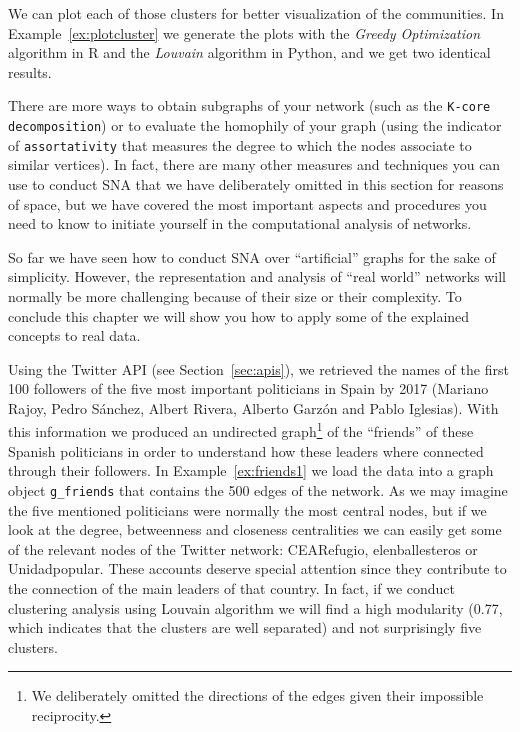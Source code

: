 
We can plot each of those clusters for better visualization of the communities. In Example~\ref{ex:plotcluster} we generate the plots with the \emph{Greedy Optimization} algorithm in R and the \emph{Louvain} algorithm in Python, and we get two identical results.


There are more ways to obtain subgraphs of your network (such as the \texttt{K-core decomposition}) or to evaluate the homophily of your graph (using the indicator of \texttt{assortativity} that measures the degree to which the nodes associate to similar vertices). In fact, there are many other measures and techniques you can use to conduct SNA that we have deliberately omitted in this section for reasons of space, but we have covered the most important aspects and procedures you need to know to initiate yourself in the computational analysis of networks.

So far we have seen how to conduct SNA over ``artificial'' graphs for the sake of simplicity. However, the representation and analysis of ``real world'' networks will normally be more challenging because of their size or their complexity. To conclude this chapter we will show you how to apply some of the explained concepts to real data.

Using the Twitter API (see Section~\ref{sec:apis}), we retrieved the names of the first 100 followers of the five most important politicians in Spain by 2017 (Mariano Rajoy, Pedro S\'anchez, Albert Rivera, Alberto Garz\'on and Pablo Iglesias). With this information we produced an undirected graph\footnote{We deliberately omitted the directions of the edges given their impossible reciprocity.} of the ``friends'' of these Spanish politicians in order to understand how these leaders where connected through their followers. In Example~\ref{ex:friends1} we load the data into a graph object \texttt{g\_friends} that contains the 500 edges of the network. As we may imagine the five mentioned politicians were normally the most central nodes, but if we look at the degree, betweenness and closeness centralities we can easily get some of the relevant nodes of the Twitter network: CEARefugio, elenballesteros or Unidadpopular. These accounts deserve special attention since they contribute to the connection of the main leaders of that country. In fact, if we conduct clustering analysis using Louvain algorithm we will find a high modularity (0.77, which indicates that the clusters are well separated) and not surprisingly five clusters.

